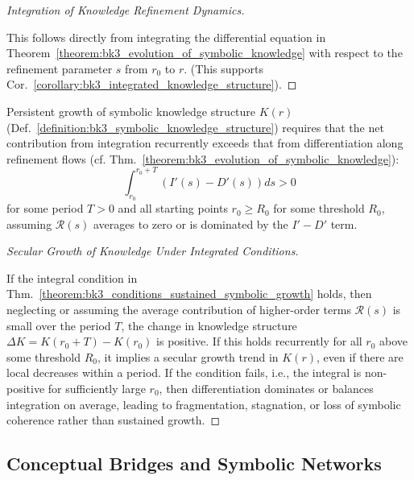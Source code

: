 \begin{proof}[Integration of Knowledge Refinement Dynamics]
\label{proof:bk3_integrated_knowledge_dynamics}
\leavevmode

This follows directly from integrating the differential equation in Theorem~\ref{theorem:bk3_evolution_of_symbolic_knowledge} with respect to the refinement parameter $s$ from $r_0$ to $r$. (This supports Cor.~\ref{corollary:bk3_integrated_knowledge_structure}).
\end{proof}

\begin{theorem} \label{theorem:bk3_conditions_sustained_symbolic_growth}
Persistent growth of symbolic knowledge structure $K(r)$ (Def.~\ref{definition:bk3_symbolic_knowledge_structure}) requires that the net contribution from integration recurrently exceeds that from differentiation along refinement flows (cf. Thm.~\ref{theorem:bk3_evolution_of_symbolic_knowledge}):
\[
\int_{r_0}^{r_0+T} (I'(s) - D'(s)) ds > 0
\]
for some period $T > 0$ and all starting points $r_0 \geq R_0$ for some threshold $R_0$, assuming $\mathcal{R}(s)$ averages to zero or is dominated by the $I'-D'$ term.
\end{theorem}

\begin{proof}[Secular Growth of Knowledge Under Integrated Conditions]
\label{proof:bk3_knowledge_growth_integrated_condition}
\leavevmode

If the integral condition in Thm.~\ref{theorem:bk3_conditions_sustained_symbolic_growth} holds, then neglecting or assuming the average contribution of higher-order terms $\mathcal{R}(s)$ is small over the period $T$, the change in knowledge structure $\Delta K = K(r_0+T) - K(r_0)$ is positive. If this holds recurrently for all $r_0$ above some threshold $R_0$, it implies a secular growth trend in $K(r)$, even if there are local decreases within a period. If the condition fails, i.e., the integral is non-positive for sufficiently large $r_0$, then differentiation dominates or balances integration on average, leading to fragmentation, stagnation, or loss of symbolic coherence rather than sustained growth.
\end{proof}

\subsection{Conceptual Bridges and Symbolic Networks}

